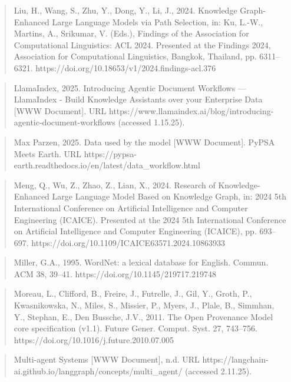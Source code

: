 \documentclass[a4paper,11pt]{report}
\begin{document}
\begin{quote}
Liu, H., Wang, S., Zhu, Y., Dong, Y., Li, J., 2024. Knowledge Graph-Enhanced Large Language Models via Path Selection, in: Ku, L.-W., Martins, A., Srikumar, V. (Eds.), Findings of the Association for Computational Linguistics: ACL 2024. Presented at the Findings 2024, Association for Computational Linguistics, Bangkok, Thailand, pp. 6311--6321. https://doi.org/10.18653/v1/2024.findings-acl.376
\end{quote}

\begin{quote}
LlamaIndex, 2025. Introducing Agentic Document Workflows --- LlamaIndex - Build Knowledge Assistants over your Enterprise Data {[}WWW Document{]}. URL https://www.llamaindex.ai/blog/introducing-agentic-document-workflows (accessed 1.15.25).
\end{quote}

\begin{quote}
Max Parzen, 2025. Data used by the model {[}WWW Document{]}. PyPSA Meets Earth. URL https://pypsa-earth.readthedocs.io/en/latest/data\_workflow.html
\end{quote}

\begin{quote}
Meng, Q., Wu, Z., Zhao, Z., Lian, X., 2024. Research of Knowledge-Enhanced Large Language Model Based on Knowledge Graph, in: 2024 5th International Conference on Artificial Intelligence and Computer Engineering (ICAICE). Presented at the 2024 5th International Conference on Artificial Intelligence and Computer Engineering (ICAICE), pp. 693--697. https://doi.org/10.1109/ICAICE63571.2024.10863933
\end{quote}

\begin{quote}
Miller, G.A., 1995. WordNet: a lexical database for English. Commun. ACM 38, 39--41. https://doi.org/10.1145/219717.219748
\end{quote}

\begin{quote}
Moreau, L., Clifford, B., Freire, J., Futrelle, J., Gil, Y., Groth, P., Kwasnikowska, N., Miles, S., Missier, P., Myers, J., Plale, B., Simmhan, Y., Stephan, E., Den Bussche, J.V., 2011. The Open Provenance Model core specification (v1.1). Future Gener. Comput. Syst. 27, 743--756. https://doi.org/10.1016/j.future.2010.07.005
\end{quote}

\begin{quote}
Multi-agent Systems {[}WWW Document{]}, n.d. URL https://langchain-ai.github.io/langgraph/concepts/multi\_agent/ (accessed 2.11.25).
\end{quote}
\end{document}
